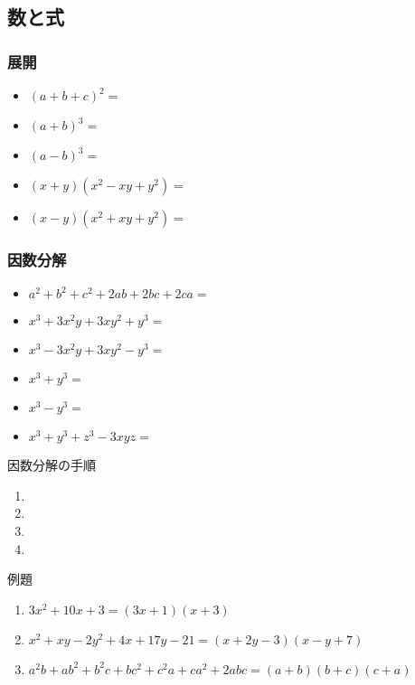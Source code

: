 \documentclass[10pt,dvipdfmx]{jsarticle}
\newcommand{\answer}[2]{{\color{orange}#2}}
\newcommand{\answer}[2]{\vspace{#1mm}}
\begin{document}
\subsection*{数と式}
\subsubsection*{展開}
\begin{Large}
  \begin{itemize}
    \item $(a+b+c)^2=$
    \item $(a+b)^3=$
    \item $(a-b)^3=$
    \item $(x+y)(x^2-xy+y^2)=$
    \item $(x-y)(x^2+xy+y^2)=$
  \end{itemize}
\end{Large}

\subsubsection*{因数分解}
\begin{Large}
  \begin{itemize}
    \item $a^2+b^2+c^2+2ab+2bc+2ca=$
    \item $x^3+3x^2y+3xy^2+y^3=$
    \item  $x^3-3x^2y+3xy^2-y^3=$
    \item $x^3+y^3=$
    \item $x^3-y^3=$
    \item $x^3+y^3+z^3-3xyz=$
  \end{itemize}
\end{Large}
\begin{itembox}[l]{因数分解の手順}
  \begin{Large}
    \begin{enumerate}
      \item %
      \item %
      \item %
      \item %
    \end{enumerate}
  \end{Large}
\end{itembox}

\begin{itembox}[l]{例題}
  \begin{large}
    \begin{enumerate}
      \item $3x^2+10x+3=$\answer{0}{$(3x+1)(x+3)$}
      \item $x^2+xy-2y^2+4x+17y-21=$\answer{0}{$(x+2y-3)(x-y+7)$}
      \item $a^2b+ab^2+b^2c+bc^2+c^2a+ca^2+2abc=$\answer{0}{$(a+b)(b+c)(c+a)$}
    \end{enumerate}
  \end{large}
\end{itembox}
\end{document}
